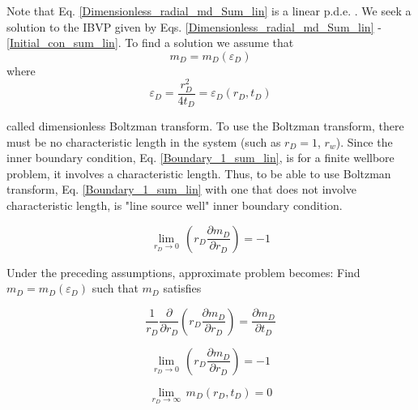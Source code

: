\documentclass{llncs}
\numberwithin{equation}{section}
\numberwithin{figure}{section}
\numberwithin{table}{section}
\begin{document}
    Note that Eq. \ref{Dimensionless_radial_md_Sum_lin} is a linear p.d.e. . We seek a solution to the IBVP given by Eqs. \ref{Dimensionless_radial_md_Sum_lin} - \ref{Initial_con_sum_lin}. To find a solution we assume that
    \begin{equation*}
    {{m}_{D}}={{m}_{D}}\left( {{\varepsilon }_{D}} \right)
    \end{equation*}
    where
    \begin{equation*}
    {{\varepsilon }_{D}}=\frac{r_{D}^{2}}{4{{t}_{D}}}={{\varepsilon }_{D}}\left( {{r}_{D}},{{t}_{D}} \right)
    \end{equation*}

     called dimensionless Boltzman transform. To use the Boltzman transform, there must be no characteristic length in the system (such as $r_{D}=1$, $r_{w}$). Since the inner boundary condition, Eq. \ref{Boundary_1_sum_lin}, is for a finite wellbore problem, it involves a characteristic length. Thus, to be able to use Boltzman transform,  Eq. \ref{Boundary_1_sum_lin}  with one that does not involve characteristic length,  is "line source well" inner boundary condition.

    \begin{equation}
        \underset{{{r}_{D}}\to 0}{\mathop{\lim }}\,\left( {{r}_{D}}\frac{\partial {{m}_{D}}}{\partial {{r}_{D}}} \right)=-1
        \label{Line_source_boundary}
    \end{equation}

    Under the preceding assumptions, approximate problem becomes: Find $m_{D}=m_{D}({\varepsilon }_{D})$ such that $m_{D}$ satisfies

    \begin{equation}
        \frac{1}{{{r}_{D}}}\frac{\partial }{\partial {{r}_{D}}}\left( {{r}_{D}}\frac{\partial {{m}_{D}}}{\partial {{r}_{D}}} \right)=\frac{\partial {{m}_{D}}}{\partial {{t}_{D}}}
        \label{Line_Source}
    \end{equation}

    \begin{equation}
        \underset{{{r}_{D}}\to 0}{\mathop{\lim }}\,\left( {{r}_{D}}\frac{\partial {{m}_{D}}}{\partial {{r}_{D}}} \right)=-1
        \label{Boundary_Line_Source1}
    \end{equation}

    \begin{equation}
        \underset{{{r}_{D}}\to \infty }{\mathop{\lim }}\,{{m}_{D}}\left( {{r}_{D}},{{t}_{D}} \right)=0
        \label{Boundary_Line_Source2}
    \end{equation}
\end{document}
